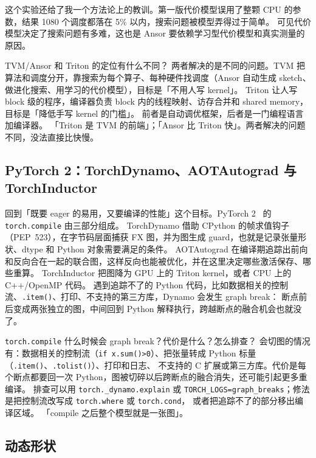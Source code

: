 这个实验还给了我一个方法论上的教训。第一版代价模型误用了整颗 CPU 的参数，结果 1080 个调度都落在 5\% 以内，搜索问题被模型弄得过于简单。
可见代价模型决定了搜索问题有多难，这也是 Ansor 要依赖学习型代价模型和真实测量的原因。

\begin{qa}{TVM/Ansor 和 Triton 的定位有什么不同？}
\ans 两者解决的是不同的问题。TVM 把算法和调度分开，靠搜索为每个算子、每种硬件找调度（Ansor 自动生成 sketch、做进化搜索、用学习的代价模型），目标是「不用人写 kernel」。
Triton 让人写 block 级的程序，编译器负责 block 内的线程映射、访存合并和 shared memory，目标是「降低手写 kernel 的门槛」。
前者是自动调优框架，后者是一门编程语言加编译器。
\wrong 「Triton 是 TVM 的前端」；「Ansor 比 Triton 快」。两者解决的问题不同，没法直接比快慢。
\end{qa}

\subsection{PyTorch 2：TorchDynamo、AOTAutograd 与 TorchInductor}

回到「既要 eager 的易用，又要编译的性能」这个目标。PyTorch 2~\cite{ansel2024pytorch2} 的 \texttt{torch.compile} 由三部分组成。
TorchDynamo 借助 CPython 的帧求值钩子（PEP~523），在字节码层面捕获 FX 图，并为图生成 guard，也就是记录张量形状、dtype 和 Python 对象需要满足的条件。
AOTAutograd 在编译期追踪出前向和反向合在一起的联合图，这样反向也能被优化，并在这里决定哪些激活保存、哪些重算。
TorchInductor 把图降为 GPU 上的 Triton kernel，或者 CPU 上的 C++/OpenMP 代码。
遇到追踪不了的 Python 代码，比如数据相关的控制流、\texttt{.item()}、打印、不支持的第三方库，Dynamo 会发生 graph break：
断点前后变成两张独立的图，中间回到 Python 解释执行，跨越断点的融合机会也就没了。

\begin{qa}{\texttt{torch.compile} 什么时候会 graph break？代价是什么？怎么排查？}
\ans 会切图的情况有：数据相关的控制流（\texttt{if x.sum()>0}）、把张量转成 Python 标量（\texttt{.item()}、\texttt{.tolist()}）、打印和日志、
不支持的 C 扩展或第三方库。代价是每个断点都要回一次 Python，图被切碎以后跨断点的融合消失，还可能引起更多重编译。
排查可以用 \texttt{torch.\_dynamo.explain} 或 \texttt{TORCH\_LOGS=graph\_breaks}；修法是把控制流改写成 \texttt{torch.where} 或 \texttt{torch.cond}，
或者把追踪不了的部分移出编译区域。
\wrong 「compile 之后整个模型就是一张图」。
\end{qa}

\subsection{动态形状}

